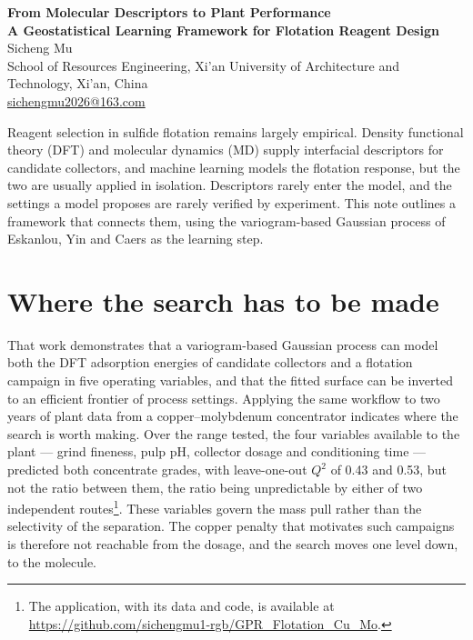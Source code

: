 \documentclass[10pt]{article}
\begin{document}
\begin{center}
{\large\bfseries From Molecular Descriptors to Plant Performance}\\[2pt]
{\bfseries A Geostatistical Learning Framework for Flotation Reagent Design}\\[4pt]
{\small Sicheng Mu}\\[1pt]
{\footnotesize School of Resources Engineering, Xi'an University of Architecture and Technology, Xi'an, China\\
\href{mailto:sichengmu2026@163.com}{sichengmu2026@163.com}}
\end{center}

\vspace{-4pt}
\noindent
Reagent selection in sulfide flotation remains largely empirical. Density functional theory (DFT) and molecular dynamics (MD) supply interfacial descriptors for candidate collectors, and machine learning models the flotation response, but the two are usually applied in isolation. Descriptors rarely enter the model, and the settings a model proposes are rarely verified by experiment. This note outlines a framework that connects them, using the variogram-based Gaussian process of Eskanlou, Yin and Caers as the learning step.

\section{Where the search has to be made}
That work demonstrates that a variogram-based Gaussian process can model both the DFT adsorption energies of candidate collectors and a flotation campaign in five operating variables, and that the fitted surface can be inverted to an efficient frontier of process settings. Applying the same workflow to two years of plant data from a copper--molybdenum concentrator indicates where the search is worth making. Over the range tested, the four variables available to the plant --- grind fineness, pulp pH, collector dosage and conditioning time --- predicted both concentrate grades, with leave-one-out $Q^2$ of 0.43 and 0.53, but not the ratio between them, the ratio being unpredictable by either of two independent routes\footnote{The application, with its data and code, is available at \url{https://github.com/sichengmu1-rgb/GPR_Flotation_Cu_Mo}.}. These variables govern the mass pull rather than the selectivity of the separation. The copper penalty that motivates such campaigns is therefore not reachable from the dosage, and the search moves one level down, to the molecule.
\end{document}
